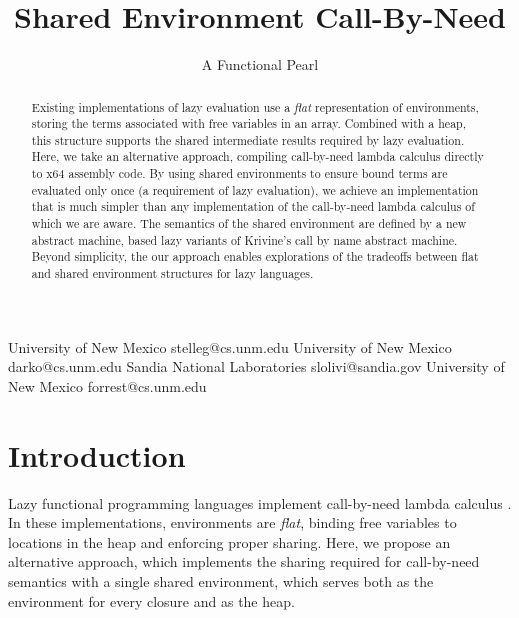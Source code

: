 \documentclass[preprint]{sigplanconf}
\begin{document}
\title{Shared Environment Call-By-Need}
\subtitle{A Functional Pearl}

           {University of New Mexico}
           {stelleg@cs.unm.edu}
           {University of New Mexico}
           {darko@cs.unm.edu}
           {Sandia National Laboratories}
           {slolivi@sandia.gov}
           {University of New Mexico}
           {forrest@cs.unm.edu}

\maketitle

\begin{abstract}
  Existing implementations of lazy evaluation use a \emph{flat}
  representation of environments, storing the terms associated with
  free variables in an array.  Combined with a heap, this structure
  supports the shared intermediate results required by lazy
  evaluation.  Here, we take an alternative approach, compiling
  call-by-need lambda calculus directly to x64 assembly code.  By
  using shared environments to ensure bound terms are evaluated only
  once (a requirement of lazy evaluation), we achieve an
  implementation that is much simpler than any implementation of the
  call-by-need lambda calculus of which we are aware.  The semantics
  of the shared environment are defined by a new abstract machine, based
  lazy variants of Krivine's call by name abstract machine.  Beyond simplicity,
  the our approach enables explorations of the tradeoffs between flat and shared
  environment structures for lazy languages.

\end{abstract}

\section{Introduction} \label{sec:intro}

Lazy functional programming languages implement call-by-need lambda calculus
\cite{ariola1995call}. In these implementations, environments are \emph{flat},
binding free variables to locations in the heap and enforcing proper sharing.
Here, we propose an alternative approach, which implements the sharing required
for call-by-need semantics with a single shared environment, which serves both
as the environment for every closure and as the heap. 
\end{document}
